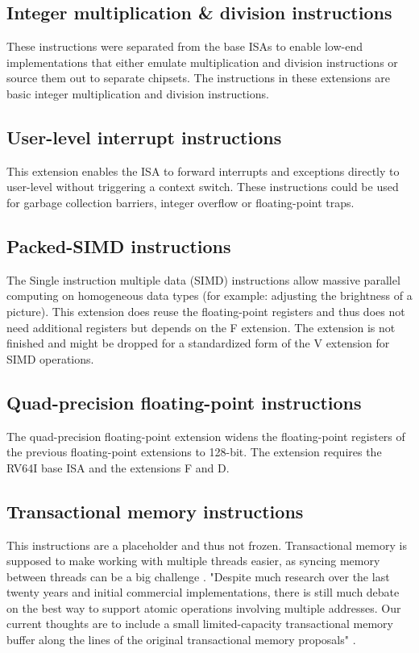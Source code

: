 \subsection{Integer multiplication \& division instructions}
These instructions were separated from the base ISAs to enable
low-end implementations that either emulate multiplication and
division instructions or source them out to separate
chipsets. The instructions in these extensions are basic
integer multiplication and division instructions.

\subsection{User-level interrupt instructions}
This extension enables the ISA to forward
interrupts and exceptions directly to user-level
without triggering a context switch.
These instructions could be used for garbage collection
barriers, integer overflow or floating-point traps.

\subsection{Packed-SIMD instructions}
The Single instruction multiple data (SIMD) instructions
allow massive parallel computing on homogeneous data
types (for example: adjusting the brightness of a picture).
This extension does reuse the floating-point registers
and thus does not need additional registers but depends on
the F extension.
The extension is not finished and might be dropped for
a standardized form of the V extension for SIMD operations.

\subsection{Quad-precision floating-point instructions}
The quad-precision floating-point extension widens
the floating-point registers of the previous
floating-point extensions to 128-bit.
The extension requires the RV64I base ISA
and the extensions F and D.

\subsection{Transactional memory instructions}
\label{chap:transactional_memory_instructions}
This instructions are a placeholder and thus not frozen.
Transactional memory is supposed to make working
with multiple threads easier, as syncing memory
between threads can be a big challenge
\cite{gnu_gcc_transactional_memory}.\newline
"Despite much research over the last twenty years
and initial commercial implementations, there
is still much debate on the best way to support 
atomic operations involving multiple addresses.
Our current thoughts are to include a small
limited-capacity transactional memory buffer
along the lines of the original transactional
memory proposals"
\cite[p.~89]{risc-v_isa_manual_user_level}.

